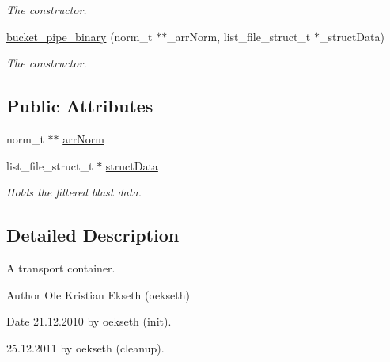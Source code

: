 \begin{DoxyCompactItemize}
\begin{DoxyCompactList}\small\item\em The constructor. \end{DoxyCompactList}\item 
\hypertarget{structbucket__pipe__binary_af3f70b06af22671ce18353961890aa4b}{
\hyperlink{structbucket__pipe__binary_af3f70b06af22671ce18353961890aa4b}{bucket\_\-pipe\_\-binary} (norm\_\-t $\ast$$\ast$\_\-arrNorm, list\_\-file\_\-struct\_\-t $\ast$\_\-structData)}
\label{structbucket__pipe__binary_af3f70b06af22671ce18353961890aa4b}

\begin{DoxyCompactList}\small\item\em The constructor. \end{DoxyCompactList}\end{DoxyCompactItemize}
\subsection*{Public Attributes}
\begin{DoxyCompactItemize}
\item 
norm\_\-t $\ast$$\ast$ \hyperlink{structbucket__pipe__binary_ac7267654a8cc691e7e7ee7725b13affa}{arrNorm}
\item 
\hypertarget{structbucket__pipe__binary_af1cc32b5100991b95e767ac5da822b06}{
list\_\-file\_\-struct\_\-t $\ast$ \hyperlink{structbucket__pipe__binary_af1cc32b5100991b95e767ac5da822b06}{structData}}
\label{structbucket__pipe__binary_af1cc32b5100991b95e767ac5da822b06}

\begin{DoxyCompactList}\small\item\em Holds the filtered blast data. \end{DoxyCompactList}\end{DoxyCompactItemize}


\subsection{Detailed Description}
A transport container. 

\begin{DoxyAuthor}{Author}
Ole Kristian Ekseth (oekseth) 
\end{DoxyAuthor}
\begin{DoxyDate}{Date}
21.12.2010 by oekseth (init). 

25.12.2011 by oekseth (cleanup). 
\end{DoxyDate}


